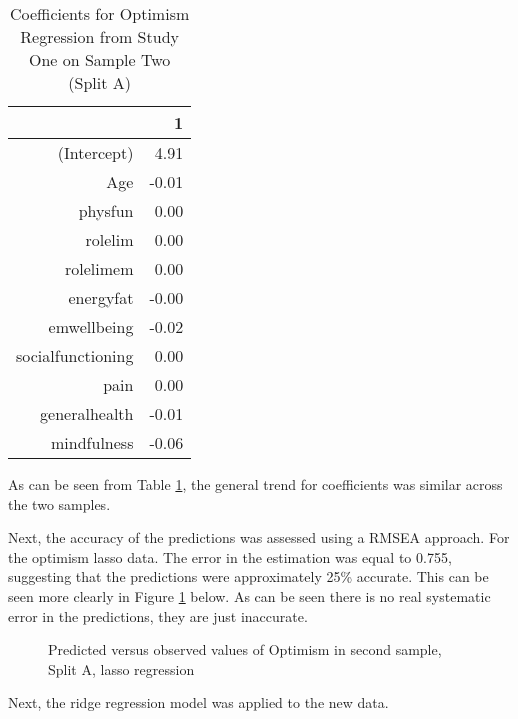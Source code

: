 \documentclass{article}
\begin{document}
\begin{table}[ht]
\centering
\begin{tabular}{rr}
  \hline
 & 1 \\ 
  \hline
(Intercept) & 4.91 \\ 
  Age & -0.01 \\ 
  physfun & 0.00 \\ 
  rolelim & 0.00 \\ 
  rolelimem & 0.00 \\ 
  energyfat & -0.00 \\ 
  emwellbeing & -0.02 \\ 
  socialfunctioning & 0.00 \\ 
  pain & 0.00 \\ 
  generalhealth & -0.01 \\ 
  mindfulness & -0.06 \\ 
   \hline
\end{tabular}
\caption{Coefficients for Optimism Regression from Study One on Sample Two (Split A)} 
\label{tab:homoptlasso2a}
\end{table}
As can be seen from Table \ref{tab:homoptlasso2a}, the general trend for coefficients was similar across the two samples. 

Next, the accuracy of the predictions was assessed using a RMSEA approach. For the optimism lasso data. The error in the estimation was equal to 0.755, suggesting that the predictions were approximately 25\% accurate. This can be seen more clearly in Figure \ref{fig:plotoptlassopred} below. As can be seen there is no real systematic error in the predictions, they are just inaccurate.


\begin{figure}
  \caption{Predicted versus observed values of Optimism in second sample, Split A, lasso regression}
  \label{fig:plotoptlassopred}
\end{figure}


Next, the ridge regression model was applied to the new data. 
\end{document}
